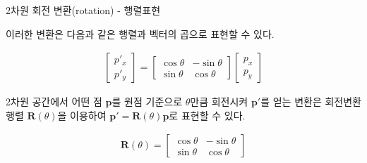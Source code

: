 \begin{frame}{2차원 회전 변환(rotation) - 행렬표현}

이러한 변환은 다음과 같은 행렬과 벡터의 곱으로 표현할 수 있다.

\begin{eqnarray}
\left [
\begin{array}{c}
p'_x \\ p'_y
\end{array}
\right ] =
\left [
\begin{array}{cc}
\cos \theta & - \sin \theta \\
\sin \theta & \cos \theta
\end{array}
\right ]
\left [
\begin{array}{c}
p_x \\
p_y
\end{array}
\right ] \nonumber
\end{eqnarray}

2차원 공간에서 어떤 점 $\mathbf p$를 원점 기준으로 $\theta$만큼 회전시켜 $\mathbf p'$를 얻는 변환은 회전변환 행렬 $\mathbf R(\theta)$을
이용하여 $\mathbf p' = \mathbf R(\theta) \mathbf p$로 표현할 수 있다.

\begin{eqnarray}
\mathbf R(\theta) = \left [ 
\begin{array}{cc}
\cos \theta & - \sin \theta \\
\sin \theta & \cos \theta
\end{array}
\right ] \nonumber
\end{eqnarray} 

\end{frame}


